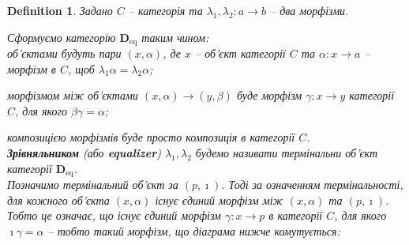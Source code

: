 \documentclass[a4paper, 10pt]{article}
\theoremstyle{theoremdd}
\newtheorem{definition}[theorem]{Definition}
\begin{document}
\begin{definition}
Задано $C$ -- категорія та $\lambda_1,\lambda_2 \colon a \to b$ -- два морфізми.
\begin{figure}[H]
\centering
{}
\end{figure}
\noindent
Сформуємо категорію $\textbf{D}_{\text{eq}}$ таким чином:\\
об'єктами будуть пари $(x,\alpha)$, де $x$ -- об'єкт категорії $C$ та $\alpha \colon x \to a$ -- морфізм в $C$, щоб $\lambda_1 \alpha = \lambda_2 \alpha$;
\begin{figure}[H]
\centering
{}
\end{figure}
\noindent
морфізмом між об'єктами $(x,\alpha) \to (y,\beta)$ буде морфізм $\gamma \colon x \to y$ категорії $C$, для якого $\beta \gamma = \alpha$;
\begin{figure}[H]
\centering
{}
\end{figure}
\noindent
композицією морфізмів буде просто композиція в категорії $C$.\\
\textbf{Зрівняльником} (або \textbf{equalizer}) $\lambda_1,\lambda_2$ будемо називати термінальни об'єкт категорії $\textbf{D}_{\text{eq}}$.
\bigskip \\
Позначимо термінальний об'єкт за $(p,\imath)$. Тоді за означенням термінальності, для кожного об'єкта $(x,\alpha)$ існує єдиний морфізм між $(x,\alpha)$ та $(p,\imath)$. Тобто це означає, що існує єдиний морфізм $\gamma \colon x \to p$ в категорії $C$, для якого $\imath \gamma = \alpha$ -- тобто такий морфізм, що діаграма нижче комутується:
\begin{figure}[H]
\centering
{}
\end{figure}
\end{definition}
\end{document}
